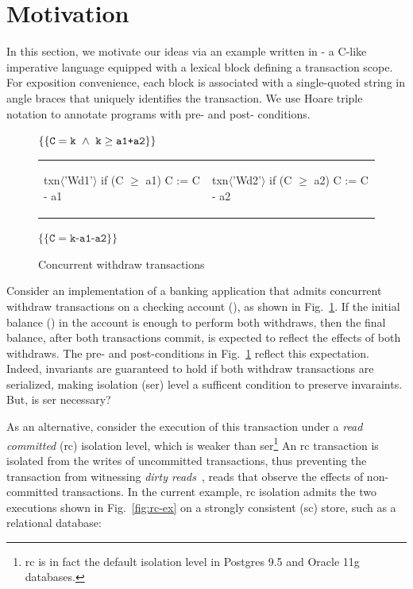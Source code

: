 \section{Motivation}
\label{sec:motivation}

In this section, we motivate our ideas via an example written in
\txnimp - a C-like imperative language equipped with a  lexical
block defining a transaction scope.  For exposition convenience, each
 block is associated with a single-quoted string in angle
braces that uniquely identifies the transaction. We use Hoare triple
notation to annotate programs with pre- and post- conditions.

\begin{figure}
\centering
$\{\{\texttt{C}=\texttt{k} ~\wedge~ \texttt{k}\ge\texttt{a1+a2}\}\}$
\begin{tabular}{l||l}
\begin{txnimpcode}
  txn$\langle$'Wd1'$\rangle${
    if (C $\ge$ a1) {
      C := C - a1
    }
  }
\end{txnimpcode}
&
\begin{txnimpcode}
  txn$\langle$'Wd2'$\rangle${
    if (C $\ge$ a2) {
      C := C - a2
    }
  }
\end{txnimpcode}
\\
\end{tabular}
$\{\{\texttt{C}=\texttt{k-a1-a2}\}\}$

\caption{Concurrent withdraw transactions}
\label{fig:motiv-eg-1}
\end{figure}

Consider an implementation of a banking application that admits
concurrent withdraw transactions on a checking account (), as
shown in Fig.~\ref{fig:motiv-eg-1}. If the initial balance () in
the account is enough to perform both withdraws, then the final
balance, after both transactions commit, is expected to reflect the
effects of both withdraws. The pre- and post-conditions in
Fig.~\ref{fig:motiv-eg-1} reflect this expectation. Indeed, invariants
are guaranteed to hold if both withdraw transactions are serialized,
making  isolation ({\sc ser}) level a sufficent
condition to preserve invaraints. But, is {\sc ser} necessary?

As an alternative, consider the execution of this transaction under a
\emph{read committed} ({\sc rc}) isolation level, which is weaker than
     {\sc ser}\footnote{{\sc rc} is in fact the default isolation
       level in Postgres 9.5 and Oracle 11g databases.} An {\sc rc}
     transaction is isolated from the writes of uncommitted
     transactions, thus preventing the transaction from witnessing
     \emph{dirty reads}~\cite{berenson}, reads that observe the
     effects of non-committed transactions. In the current example,
     {\sc rc} isolation admits the two executions shown in
     Fig.~\ref{fig:rc-ex} on a strongly consistent ({\sc sc}) store,
     such as a relational database:

